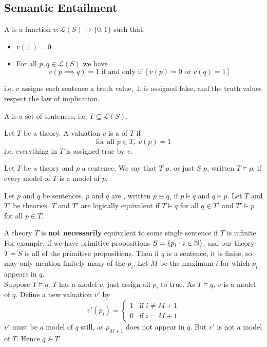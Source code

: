 \documentclass[11pt]{article}
\begin{document}
\subsection{Semantic Entailment}
\begin{defi}
    [Valuation]
    A  is a function $v:\mathcal{L}(S) \rightarrow \{0, 1\}$ such that.
    \begin{itemize}
        \item $v(\bot)=0$
        \item For all $p, q \in \mathcal{L}(S)$ we have 
        \[v(p \implies q) = 1 \text{ if and only if } \left[v(p) = 0 \text{ or } v(q) = 1\right] \]
    \end{itemize}
    i.e. $v$ assigns each sentence a truth value, $\bot$ is assigned false, and the truth values respect the law of implication.
\end{defi}
\begin{defi}
    [Theory]
    A  is a set of sentences, i.e. $T \subseteq \mathcal{L}(S).$
\end{defi}
\begin{defi}
    [Model]
    Let $T$ be a theory. A valuation $v$ is a  of $T$ if
    \[\text{for all } p \in T, \ v(p) = 1 \]
    i.e. everything in $T$ is assigned true by $v$.
\end{defi}
\begin{defi}
    Let $T$ be a theory and $p$ a sentence. We say that $T$  $p$, or just $S$  $p$, written $T \vDash p$, if every model of $T$ is a model of $p$. 
\end{defi}
\begin{defi}
    Let $p$ and $q$ be sentences. $p$ and $q$ are , written $p \equiv q$, if $p \vDash q$ and $q \vDash p$.
    \mypar
    Let $T$ and $T'$ be theories. $T$ and $T'$ are logically equivalent if $T \vDash q$ for all $q \in T'$ and $T' \vDash p$ for all $p \in T$.
\end{defi}
\begin{warning}
    A theory $T$ is \textbf{not necessarily} equivalent to some single sentence if $T$ is infinite.
    \\ For example, if we have primitive propositions $S = \{p_i : i \in \mathbb{N}\}$, and our theory $T = S$ is all of the primitive propositions. Then if $q$ is a sentence, it is finite, so may only mention finitely many of the $p_i$. Let $M$ be the maximum $i$ for which $p_i$ appears in $q$.
    \\ Suppose $T \vDash q$. $T$ has a model $v$, just assign all $p_i$ to true. As $T \vDash q$, $v$ is a model of $q$.
    Define a new valuation $v'$ by
    \[ v'(p_i) = \begin{cases}
        1 & \text{if } i \not= M+1
        \\ 0 & \text{if } i = M+1
    \end{cases}\]
    $v'$ must be a model of $q$ still, as $p_{M+1}$ does not appear in $q$. But $v'$ is not a model of $T$. Hence $q \not\vDash T$.
\end{warning}
\end{document}
